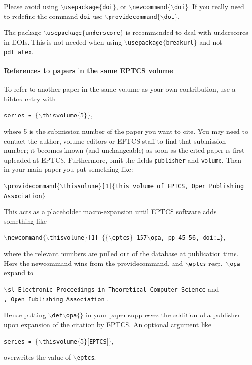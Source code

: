 \documentclass[submission,copyright,creativecommons]{eptcs}
\begin{document}
Please avoid using {\tt $\backslash$usepackage$\{$doi$\}$}, or
{\tt $\backslash$newcommand$\{\backslash$doi$\}$}.
If you really need to redefine the command {\tt doi}
use {\tt $\backslash$providecommand$\{\backslash$doi$\}$}.

The package {\tt $\backslash$usepackage$\{$underscore$\}$} is
recommended to deal with underscores in DOIs. This is not needed when
using {\tt $\backslash$usepackage$\{$breakurl$\}$} and not {\tt pdflatex}.

\paragraph{References to papers in the same EPTCS volume}

To refer to another paper in the same volume as your own contribution,
use a bibtex entry with
\begin{center}
  {\tt series    = $\{\backslash$thisvolume$\{5\}\}$},
\end{center}
where 5 is the submission number of the paper you want to cite.
You may need to contact the author, volume editors or EPTCS staff to
find that submission number; it becomes known (and unchangeable)
as soon as the cited paper is first uploaded at EPTCS\@.
Furthermore, omit the fields {\tt publisher} and {\tt volume}.
Then in your main paper you put something like:

\noindent
{\small \tt $\backslash$providecommand$\{\backslash$thisvolume$\}$[1]$\{$this
  volume of EPTCS, Open Publishing Association$\}$}

\noindent
This acts as a placeholder macro-expansion until EPTCS software adds
something like

\noindent
{\small \tt $\backslash$newcommand$\{\backslash$thisvolume$\}$[1]%
  $\{\{\backslash$eptcs$\}$ 157$\backslash$opa, pp 45--56, doi:\dots$\}$},

\noindent
where the relevant numbers are pulled out of the database at publication time.
Here the newcommand wins from the providecommand, and {\tt \small $\backslash$eptcs}
resp.\ {\tt \small $\backslash$opa} expand to

\noindent
{\small \tt $\backslash$sl Electronic Proceedings in Theoretical Computer Science} \hfill and\\
{\small \tt , Open Publishing Association} \hfill .

\noindent
Hence putting {\small \tt $\backslash$def$\backslash$opa$\{\}$} in
your paper suppresses the addition of a publisher upon expansion of the citation by EPTCS\@.
An optional argument like
\begin{center}
  {\tt series    = $\{\backslash$thisvolume$\{5\}[$EPTCS$]\}$},
\end{center}
overwrites the value of {\tt \small $\backslash$eptcs}.



\end{document}
